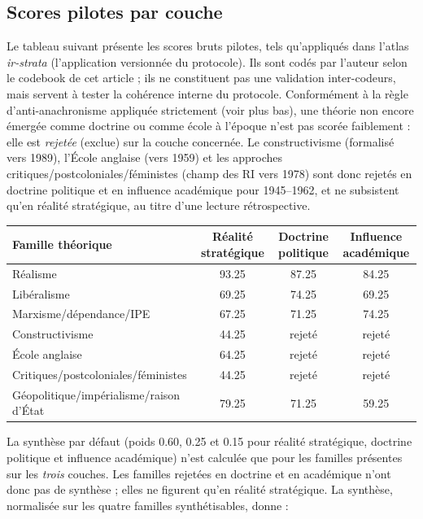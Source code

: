 \documentclass[11pt,a4paper]{article}
\begin{document}
\subsection{Scores pilotes par couche}

Le tableau suivant présente les scores bruts pilotes, tels qu'appliqués dans l'atlas \emph{ir-strata} (l'application versionnée du protocole). Ils sont codés par l'auteur selon le codebook de cet article ; ils ne constituent pas une validation inter-codeurs, mais servent à tester la cohérence interne du protocole. Conformément à la règle d'anti-anachronisme appliquée strictement (voir plus bas), une théorie non encore émergée comme doctrine ou comme école à l'époque n'est pas scorée faiblement : elle est \emph{rejetée} (exclue) sur la couche concernée. Le constructivisme (formalisé vers 1989), l'École anglaise (vers 1959) et les approches critiques/postcoloniales/féministes (champ des RI vers 1978) sont donc rejetés en doctrine politique et en influence académique pour 1945--1962, et ne subsistent qu'en réalité stratégique, au titre d'une lecture rétrospective.

\begin{center}
\begin{tabular}{p{5cm}ccc}
\hline
Famille théorique & Réalité stratégique & Doctrine politique & Influence académique \\
\hline
Réalisme & 93.25 & 87.25 & 84.25 \\
Libéralisme & 69.25 & 74.25 & 69.25 \\
Marxisme/dépendance/IPE & 67.25 & 71.25 & 74.25 \\
Constructivisme & 44.25 & rejeté & rejeté \\
École anglaise & 64.25 & rejeté & rejeté \\
Critiques/postcoloniales/féministes & 44.25 & rejeté & rejeté \\
Géopolitique/impérialisme/raison d'État & 79.25 & 71.25 & 59.25 \\
\hline
\end{tabular}
\end{center}

La synthèse par défaut (poids 0.60, 0.25 et 0.15 pour réalité stratégique, doctrine politique et influence académique) n'est calculée que pour les familles présentes sur les \emph{trois} couches. Les familles rejetées en doctrine et en académique n'ont donc pas de synthèse ; elles ne figurent qu'en réalité stratégique. La synthèse, normalisée sur les quatre familles synthétisables, donne :
\end{document}
